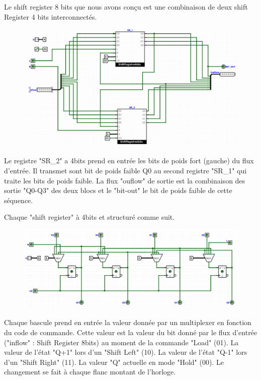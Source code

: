\documentclass[a4paper]{article} %
\begin{document}
\begin{tcolorbox}[colframe=Monokaimagenta,colback=white, breakable, enhanced]
Le shift register 8 bits que nous avons conçu est une combinaison de deux shift Register 4 bits interconnectés. 
\begin{figure}[H]
	\centering
	\includegraphics[width=\textwidth]{src/SR_8b}
	\label{fig:SR_8b}
\end{figure}
Le registre "SR\_2" a 4bits prend en entrée les bits de poids fort (gauche) du flux d'entrée. Il transmet sont bit de poids faible Q0 au second registre "SR\_1" qui traite les bits de poids faible. La flux "ouflow" de sortie est la combinaison des sortie "Q0-Q3" des deux blocs et le "bit-out" le bit de poids faible de cette séquence.

Chaque "shift register" à 4bits et structuré comme suit.
\begin{figure}[H]
	\centering
	\includegraphics[width=\textwidth]{src/SR_4b}
	\label{fig:SR_4b}
\end{figure}
Chaque bascule prend en entrée la valeur donnée par un multiplexer en fonction du code de commande. Cette valeur est la valeur du bit donné par le flux d'entrée ("inflow" : Shift Register 8bits) au moment de la commande "Load" (01). La valeur de l'état "Q+1" lors d'un "Shift Left" (10). La valeur de l'état "Q-1" lors d'un "Shift Right" (11). La valeur "Q" actuelle en mode "Hold" (00). Le changement se fait à chaque flanc montant de l'horloge.

\end{tcolorbox}
\end{document}
